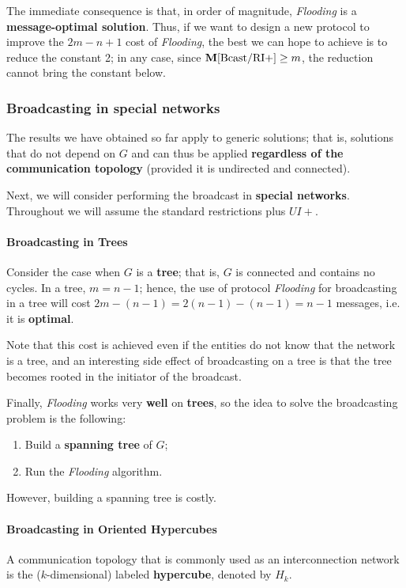 The immediate consequence is that, in order of magnitude, \textit{Flooding} is a \textbf{message-optimal solution}. Thus, if we want to design a new protocol to improve the $2m - n + 1$ cost of \textit{Flooding}, the best we can hope to achieve is to reduce the constant 2; in any case, since $\mathbf{M}[\text{Bcast/RI+}] \geq m$, the reduction cannot bring the constant below. 

\subsubsection{Broadcasting in special networks}
The results we have obtained so far apply to generic solutions; that is, solutions that do not depend on $G$ and can thus be applied \textbf{regardless of the communication topology} (provided it is undirected and connected). 

Next, we will consider performing the broadcast in \textbf{special networks}. Throughout we will assume the standard restrictions plus $UI+$.

\paragraph{Broadcasting in Trees} Consider the case when $G$ is a \textbf{tree}; that is, $G$ is connected and contains no cycles. In a tree, $m = n-1$; hence, the use of protocol \textit{Flooding} for broadcasting in a tree will cost $2m - (n - 1) = 2(n - 1) - (n - 1) = n - 1$ messages, i.e. it is \textbf{optimal}.

Note that this cost is achieved even if the entities do not know that the network is a tree, and an interesting side effect of broadcasting on a tree is that the tree becomes rooted in the initiator of the broadcast.

Finally, \textit{Flooding} works very \textbf{well} on \textbf{trees}, so the idea to solve the broadcasting problem is the following:
\begin{enumerate}
    \item Build a \textbf{spanning tree} of $G$;
    \item Run the \textit{Flooding} algorithm.
\end{enumerate}

However, building a spanning tree is costly.

\paragraph{Broadcasting in Oriented Hypercubes} A communication topology that is commonly used as an interconnection network is the ($k$-dimensional) labeled \textbf{hypercube}, denoted by $H_k$. 

